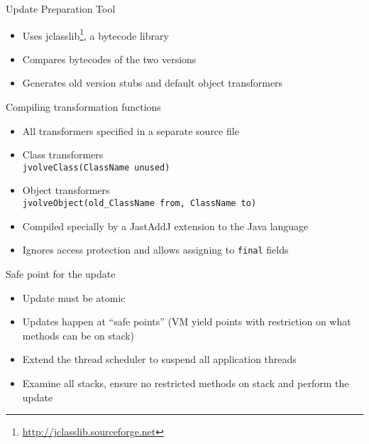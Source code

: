 \begin{frame}[t,fragile,label=offline]{Update Preparation Tool}%
\begin{itemize}
\item Uses jclasslib\footnote{\url{http://jclasslib.sourceforge.net}}, a
bytecode library
\item Compares bytecodes of the two versions
\item Generates old version stubs and default object transformers
\end{itemize}
\end{frame}

\begin{frame}[t,fragile]{Compiling transformation functions}%
\begin{itemize}
\item All transformers specified in a separate source file
\item Class transformers  \\ \hspace{6ex} {\footnotesize {\tt jvolveClass(ClassName unused)}}
\item Object transformers \\ \hspace{6ex} {\footnotesize {\tt jvolveObject(old\_ClassName from, ClassName to)}}
\item Compiled specially by a JastAddJ extension to the Java language
\item Ignores access protection and allows assigning to {\tt final} fields
\end{itemize}
\end{frame}

\begin{frame}[t,fragile,label=suspend]{Safe point for the update}%
\begin{itemize}
\item Update must be atomic
\item Updates happen at ``safe points'' (VM yield points with restriction
      on what methods can be on stack)
\item Extend the thread scheduler to suspend all application threads
\item Examine all stacks, ensure no restricted methods on stack and perform
      the update
\end{itemize}
\end{frame}

